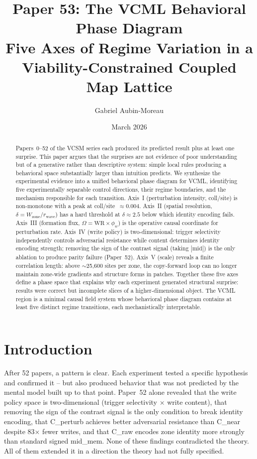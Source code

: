 \documentclass[11pt,a4paper]{article}
\title{\textbf{Paper 53: The VCML Behavioral Phase Diagram}\\
\large Five Axes of Regime Variation in a Viability-Constrained Coupled Map Lattice}
\author[1]{Gabriel Aubin-Moreau}
\affil[1]{Independent research}
\date{March 2026}
\begin{document}
\maketitle

\begin{abstract}
Papers~0--52 of the VCSM series each produced its predicted result plus at
least one surprise.
This paper argues that the surprises are not evidence of poor understanding but
of a generative rather than descriptive system: simple local rules producing a
behavioral space substantially larger than intuition predicts.
We synthesize the experimental evidence into a unified behavioral phase diagram
for VCML, identifying five experimentally separable control directions, their
regime boundaries, and the mechanism responsible for each transition.
Axis~I (perturbation intensity, coll/site) is non-monotone with a peak at
coll/site~$\approx 0.004$.
Axis~II (spatial resolution, $\delta = W_\text{zone}/r_\text{wave}$) has a
hard threshold at $\delta \approx 2.5$ below which identity encoding fails.
Axis~III (formation flux, $\Omega = \mathrm{WR} \times \phi_w$) is the
operative causal coordinate for perturbation rate.
Axis~IV (write policy) is two-dimensional: trigger selectivity independently
controls adversarial resistance while content determines identity encoding
strength; removing the sign of the contrast signal (taking $|\mathrm{mid}|$)
is the only ablation to produce parity failure (Paper~52).
Axis~V (scale) reveals a finite correlation length: above $\sim$25,600 sites
per zone, the copy-forward loop can no longer maintain zone-wide gradients and
structure forms in patches.
Together these five axes define a phase space that explains why each experiment
generated structural surprise: results were correct but incomplete slices of a
higher-dimensional object.
The VCML region is a minimal causal field system whose behavioral phase diagram
contains at least five distinct regime transitions, each mechanistically
interpretable.
\end{abstract}

\section{Introduction}

After 52 papers, a pattern is clear.
Each experiment tested a specific hypothesis and confirmed it -- but also
produced behavior that was not predicted by the mental model built up to that
point.
Paper~52 alone revealed that the write policy space is two-dimensional
(trigger selectivity $\times$ write content), that removing the sign of the
contrast signal is the only condition to break identity encoding, that
C\_perturb achieves better adversarial resistance than C\_near despite 83$\times$
fewer writes, and that C\_raw encodes zone identity more strongly than standard
signed mid\_mem.
None of these findings contradicted the theory.
All of them extended it in a direction the theory had not fully specified.
\end{document}
